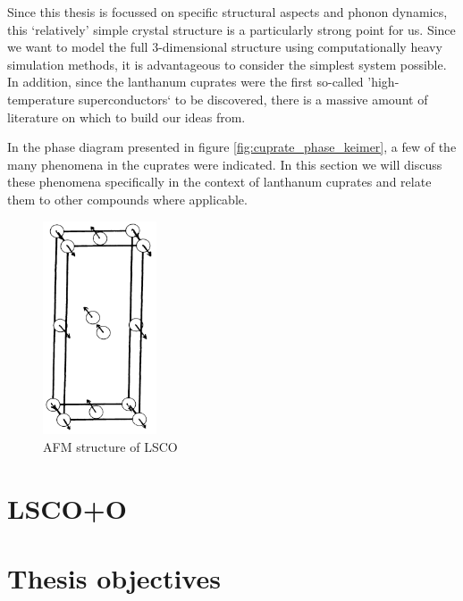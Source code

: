 Since this thesis is focussed on specific structural aspects and phonon dynamics, this `relatively' simple crystal structure is a particularly strong point for us. Since we want to model the full 3-dimensional structure using computationally heavy simulation methods, it is advantageous to consider the simplest system possible. In addition, since the lanthanum cuprates were the first so-called 'high-temperature superconductors` to be discovered, there is a massive amount of literature on which to build our ideas from.  

In the phase diagram presented in figure \ref{fig:cuprate_phase_keimer}, a few of the many phenomena in the cuprates were indicated. In this section we will discuss these phenomena specifically in the context of lanthanum cuprates and relate them to other compounds where applicable. 


\begin{figure}
    \centering
    \includegraphics[width=0.3\textwidth]{fig/lsco/lsco_afm.png}
    \caption[AFM structure of LSCO]{AFM structure of LSCO}
    \label{fig:lsco_afm}
\end{figure}

\section{LSCO+O}

\section{Thesis objectives}
